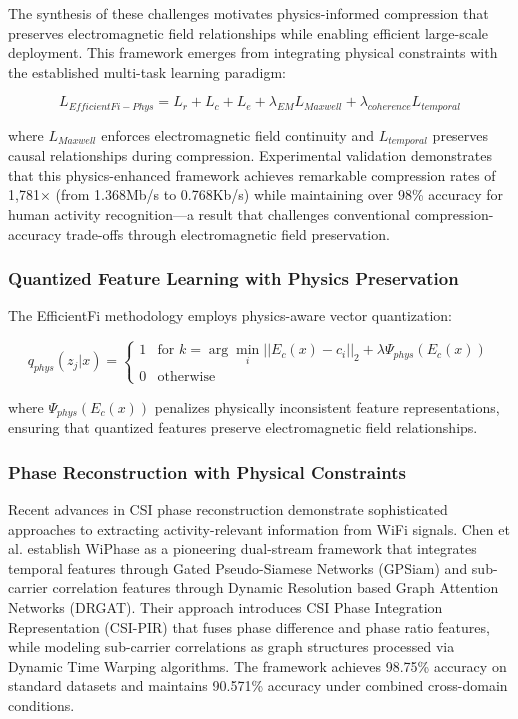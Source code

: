 \documentclass[journal]{IEEEtran}
\begin{document}
The synthesis of these challenges motivates physics-informed compression that preserves electromagnetic field relationships while enabling efficient large-scale deployment. This framework emerges from integrating physical constraints with the established multi-task learning paradigm:

\begin{equation}
L_{EfficientFi-Phys} = L_r + L_c + L_e + \lambda_{EM} L_{Maxwell} + \lambda_{coherence} L_{temporal}
\label{eq:efficientfi_physics_loss}
\end{equation}

where $L_{Maxwell}$ enforces electromagnetic field continuity and $L_{temporal}$ preserves causal relationships during compression. Experimental validation demonstrates that this physics-enhanced framework achieves remarkable compression rates of 1,781× (from 1.368Mb/s to 0.768Kb/s) while maintaining over 98\% accuracy for human activity recognition—a result that challenges conventional compression-accuracy trade-offs through electromagnetic field preservation.

\subsubsection{Quantized Feature Learning with Physics Preservation}

The EfficientFi methodology employs physics-aware vector quantization:

\begin{equation}
q_{phys}(z_j|x) = \begin{cases}
1 & \text{for } k = \arg\min_i ||E_c(x) - c_i||_2 + \lambda \Psi_{phys}(E_c(x)) \\
0 & \text{otherwise}
\end{cases}
\label{eq:quantization_physics}
\end{equation}

where $\Psi_{phys}(E_c(x))$ penalizes physically inconsistent feature representations, ensuring that quantized features preserve electromagnetic field relationships.

\subsubsection{Phase Reconstruction with Physical Constraints}

Recent advances in CSI phase reconstruction demonstrate sophisticated approaches to extracting activity-relevant information from WiFi signals. Chen et al. \cite{chen2024wiphase} establish WiPhase as a pioneering dual-stream framework that integrates temporal features through Gated Pseudo-Siamese Networks (GPSiam) and sub-carrier correlation features through Dynamic Resolution based Graph Attention Networks (DRGAT). Their approach introduces CSI Phase Integration Representation (CSI-PIR) that fuses phase difference and phase ratio features, while modeling sub-carrier correlations as graph structures processed via Dynamic Time Warping algorithms. The framework achieves 98.75\% accuracy on standard datasets and maintains 90.571\% accuracy under combined cross-domain conditions.
\end{document}
